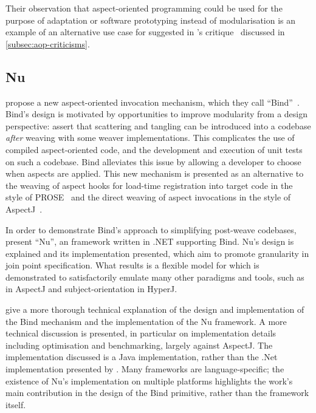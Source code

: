 Their observation that aspect-oriented programming could be used for the purpose
of adaptation or software prototyping instead of modularisation is an example of
an alternative use case for \aspectorientation{} suggested in
\citeauthor{steimann06paradoxical}'s critique~\cite{steimann06paradoxical}
discussed in \cref{subsec:aop-criticisms}.



\subsection{Nu}

\citeauthor{rajan2006nu_towardsao_invocation} propose a new aspect-oriented
invocation mechanism, which they call
``Bind''~\cite{rajan2006nu_towardsao_invocation}. Bind's design is motivated by
opportunities to improve modularity from a design perspective:
\citeauthor{rajan2006nu_towardsao_invocation} assert that scattering and
tangling can be introduced into a codebase \emph{after} weaving with some weaver
implementations. This complicates the use of compiled aspect-oriented code, and
the development and execution of unit tests on such a codebase. Bind alleviates
this issue by allowing a developer to choose when aspects are applied. This new
mechanism is presented as an alternative to the weaving of aspect hooks for
load-time registration into target code in the style of
PROSE~\cite{popovici2002PROSE,popovici2003JITaspects} and the direct weaving of
aspect invocations in the style of AspectJ~\cite{aspectj_intro}.

In order to demonstrate Bind's approach to simplifying post-weave codebases,
\citet{rajan2006nu_towardsao_invocation} present ``Nu'', an \aspectorientation{}
framework written in .NET supporting Bind. Nu's design is explained and its
implementation presented, which aim to promote granularity in join point
specification. What results is a flexible model for \aspectorientation{} which
is demonstrated to satisfactorily emulate many other paradigms and tools, such
as \aspectorientation{} in AspectJ and subject-orientation in
HyperJ.

\citet{dyerNUmasters} give a more thorough technical explanation of the design
and implementation of the Bind mechanism and the implementation of the Nu
framework. A more technical discussion is presented, in particular on
implementation details including optimisation and benchmarking, largely against
AspectJ. The implementation discussed is a Java implementation, rather than the
.Net implementation presented by \citet{rajan2006nu_towardsao_invocation}. Many
\aspectorientation{} frameworks are language-specific; the existence of Nu's
implementation on multiple platforms highlights the work's main contribution in
the design of the Bind primitive, rather than the framework itself.

